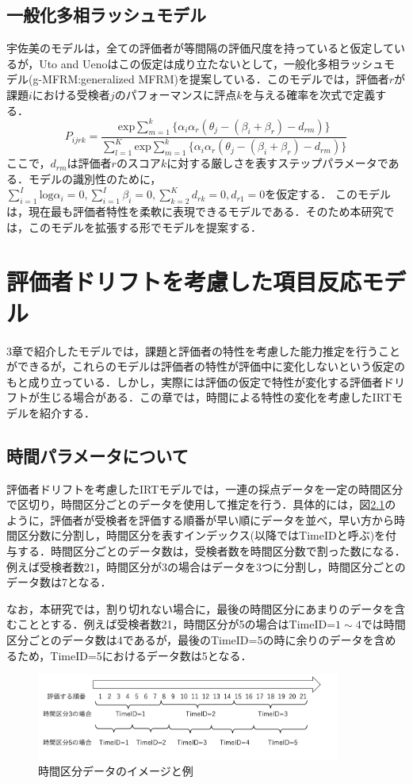 \documentclass[a4paper,11pt,oneside,openany]{jsbook}
\begin{document}
\section{一般化多相ラッシュモデル}
宇佐美のモデルは，全ての評価者が等間隔の評価尺度を持っていると仮定しているが，Uto and Ueno\cite{g-MFRM}はこの仮定は成り立たないとして，一般化多相ラッシュモデル(g-MFRM:generalized MFRM)を提案している．このモデルでは，評価者$r$が課題$i$における受検者$j$のパフォーマンスに評点$k$を与える確率を次式で定義する．
\begin{equation}
  P_{ijrk}=\frac{\mathrm{exp}\sum_{m=1}^{k}\{\alpha_i\alpha_r(\theta_{j}-(\beta_{i}+\beta_{r})-d_{rm})\}}{\sum_{l=1}^{K}\mathrm{exp}\sum_{m=1}^{k}\{\alpha_i\alpha_r(\theta_{j}-(\beta_{i}+\beta_{r})-d_{rm})\}}
\end{equation}
ここで，$d_{rm}$は評価者$r$のスコア$k$に対する厳しさを表すステップパラメータである．モデルの識別性のために，$\sum^{I}_{i=1}{\mathrm{log}\alpha_i}=0,\sum^{I}_{i=1}{\beta_i}=0,\sum^{K}_{k=2}{d_{rk}}=0, d_{r1}=0$を仮定する．
このモデルは，現在最も評価者特性を柔軟に表現できるモデルである．そのため本研究では，このモデルを拡張する形でモデルを提案する．

\chapter{評価者ドリフトを考慮した項目反応モデル}
3章で紹介したモデルでは，課題と評価者の特性を考慮した能力推定を行うことができるが，これらのモデルは評価者の特性が評価中に変化しないという仮定のもと成り立っている．しかし，実際には評価の仮定で特性が変化する評価者ドリフトが生じる場合がある．この章では，時間による特性の変化を考慮したIRTモデルを紹介する．

\section{時間パラメータについて}
評価者ドリフトを考慮したIRTモデルでは，一連の採点データを一定の時間区分で区切り，時間区分ごとのデータを使用して推定を行う．具体的には，図\ref{timeid}のように，評価者が受検者を評価する順番が早い順にデータを並べ，早い方から時間区分数に分割し，時間区分を表すインデックス(以降ではTimeIDと呼ぶ)を付与する．時間区分ごとのデータ数は，受検者数を時間区分数で割った数になる．例えば受検者数21，時間区分が3の場合はデータを3つに分割し，時間区分ごとのデータ数は7となる．

なお，本研究では，割り切れない場合に，最後の時間区分にあまりのデータを含むこととする．例えば受検者数21，時間区分が5の場合はTimeID=$1\sim4$では時間区分ごとのデータ数は4であるが，最後のTimeID=5の時に余りのデータを含めるため，TimeID=5におけるデータ数は5となる．
\begin{figure}[ht]
 \centering
\includegraphics[width=10cm]{img/timeid.png}
\caption{時間区分データのイメージと例}
 \label{timeid}
\end{figure}
\end{document}
